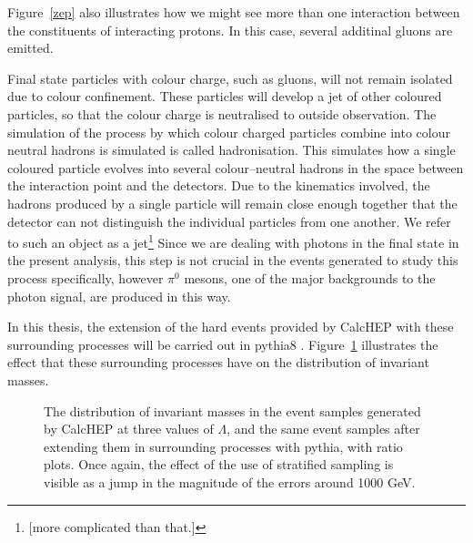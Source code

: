 Figure~\ref{zep} also illustrates how we might see more than one interaction between the constituents of interacting protons. In this case, several additinal gluons are emitted.

Final state particles with colour charge, such as gluons, will not remain isolated due to colour confinement. These particles will develop a jet of other coloured particles, so that the colour charge is neutralised to outside observation. The simulation of the process by which colour charged particles combine into colour neutral hadrons is simulated is called hadronisation. This simulates how a single coloured particle evolves into several colour--neutral hadrons in the space between the interaction point and the detectors. Due to the kinematics involved, the hadrons produced by a single particle will remain close enough together that the detector can not distinguish the individual particles from one another. We refer to such an object as a jet\footnote{[more complicated than that.]} Since we are dealing with photons in the final state in the present analysis, this step is not crucial in the events generated to study this process specifically, however $\pi^0$ mesons, one of the major backgrounds to the photon signal, are produced in this way. 

In this thesis, the extension of the hard events provided by CalcHEP with these surrounding processes will be carried out in pythia8 \cite{pythia}. Figure~\ref{pythify} illustrates the effect that these surrounding processes have on the distribution of invariant masses.

\begin{figure}[htp]
\centering
\begin{minipage}[b]{.69\textwidth}\hspace{-1.5em}\makebox[0pt][l]{
\noindent\begin{infilsf}
\tiny

\end{infilsf}}
\end{minipage}\hfill
\caption{The distribution of invariant masses in the event samples generated by CalcHEP at three values of $\Lambda$, and the same event samples after extending them in surrounding processes with pythia, with ratio plots. Once again, the effect of the use of stratified sampling is visible as a jump in the magnitude of the errors around 1000 GeV.
\label{pythify}}
\end{figure}

